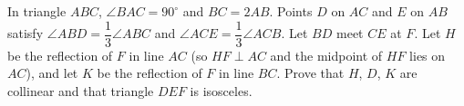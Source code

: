 In triangle $ABC$, $\angle BAC=90^\circ$ and $BC=2AB$. Points $D$ on $AC$ and $E$ on $AB$ satisfy $\angle ABD=\dfrac{1}{3}\angle ABC$ and $\angle ACE=\dfrac{1}{3}\angle ACB$. Let $BD$ meet $CE$ at $F$. Let $H$ be the reflection of $F$ in line $AC$ (so $HF\perp AC$ and the midpoint of $HF$ lies on $AC$), and let $K$ be the reflection of $F$ in line $BC$. Prove that $H$, $D$, $K$ are collinear and that triangle $DEF$ is isosceles.
